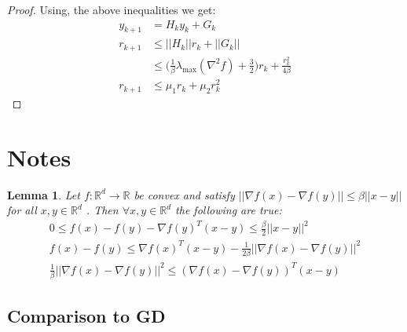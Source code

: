 \documentclass[12pt,twoside]{article}
\newtheorem{lemma}{Lemma}
\begin{document}
\begin{proof}
Using, the above inequalities we get:
\begin{equation}
\begin{aligned}
y_{k+1} &= H_k y_k + G_k \\
r_{k+1} & \leq  ||H_k|| r_k + ||G_k|| \\
& \leq \big(\frac{1}{\beta} \lambda_{\max}(\nabla^2 f) + \frac{3}{2} \big)r_k + \frac{r_k^2}{4\beta} \\
r_{k+1} & \leq \mu_1 r_k + \mu_2 r_k^2
\end{aligned}
\end{equation}
\end{proof}

\section{Notes}
\begin{lemma}
Let $f : \mathbb{R}^d \rightarrow \mathbb{R}$  be convex and satisfy $|| \nabla f(x) - \nabla f(y) || \leq \beta || x -y ||$ for all $x,y \in \mathbb{R}^d$ . Then $\forall x,y \in \mathbb{R}^d$ the following are true:
\begin{align}
0 \leq f(x) - f(y) - \nabla f(y)^T (x-y) \leq \frac{\beta}{2} || x-y ||^2 \\
f(x) - f(y) \leq \nabla f(x)^T (x-y) - \frac{1}{2 \beta} || \nabla f(x) - \nabla f(y) ||^2 \\
\frac{1}{\beta} || \nabla f(x) - \nabla f(y) ||^2  \leq( \nabla f(x) - \nabla f(y))^T(x-y)
\end{align}
\end{lemma}
\subsection{Comparison to GD}
\end{document}
